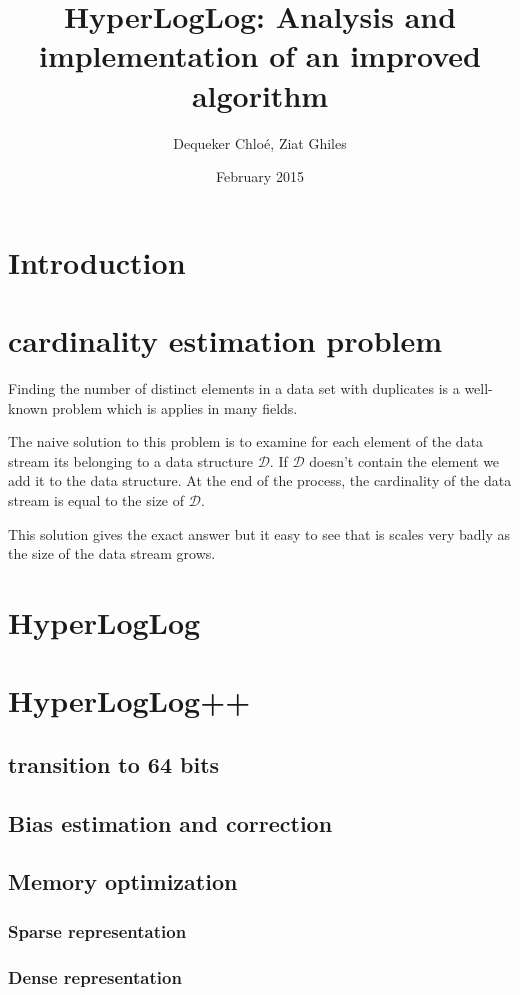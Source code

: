 \documentclass{article}
\title{HyperLogLog: Analysis and implementation of an improved algorithm}
\author{Dequeker Chloé, Ziat Ghiles}
\date{February 2015}
\begin{document}
\maketitle
\clearpage

\tableofcontents
\clearpage

\section{Introduction}

\section{cardinality estimation problem}
Finding the number of distinct elements in a data set with duplicates
is a well-known problem which is applies in many fields.

The naive solution to this problem is to examine for each element of
the data stream its belonging to a data structure $\mathcal{D}$. If
$\mathcal{D}$ doesn't contain the element we add it to the data
structure. At the end of the process, the cardinality of the data
stream is equal to the size of $\mathcal{D}$.

This solution gives the exact answer but it easy to see that is scales
very badly as the size of the data stream grows.

\section{HyperLogLog}

\section{HyperLogLog++}
\subsection{transition to 64 bits}
\subsection{Bias estimation and correction}
\subsection{Memory optimization}
\subsubsection{Sparse representation}
\subsubsection{Dense representation}
\end{document}
